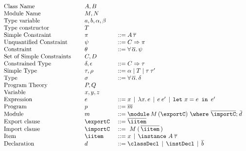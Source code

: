 \begin{figure} 

\[ \begin{array}[c]{llll}
\textrm{Class Name}         &\hspace{.1cm} & A,B            & \\
\textrm{Module Name}        &              & M,N            & \\
\textrm{Type variable}      &         & a,b,\alpha,\beta & \\
\textrm{Type constructor}   &         & T              & \\
\textrm{Simple Constraint}  &         & \pi            & ::= A\,\overline{\tau}\\
\textrm{Unquantified Constraint} &    & \psi           & ::= C\Rightarrow \pi\\
\textrm{Constraint}         &         & \theta         & ::= \forall\,\overline{\alpha}.\,\psi\\
\textrm{Set of Simple Constraints} &  & C,D            & \\
\textrm{Constrained Type}   &         & \delta,\epsilon & ::= C\Rightarrow \tau\\
\textrm{Simple Type}        &         & \tau, \rho     & ::= \alpha \mid T \mid \tau\:\tau' \\
\textrm{Type}               &         & \sigma         & ::= \forall\,\overline{\alpha}.\,\delta\\
\textrm{Program Theory}     &         & P,Q            &\\
\textrm{Variable}           &         & x, y, z        &\\
\textrm{Expression}         &         & e              & ::= x \,\mid\, \lambda x.\,e  \,\mid\, e\:e' \,\mid\, \mlet x = e\,\iin\,e'\\ 
\textrm{Program}            &         & p              & ::= \overline{m}\\
\textrm{Module}             &         & m              & ::= \module\, M\, (\exportC) \ \where\ \overline{\importC};\: \overline{\!d}\\
\textrm{Export clause}      &         & \exportC\      & ::= \overline{\iitem}\\
\textrm{Import clause}      &         & \importC\      & ::= \ M\: (\,\overline{\iitem}\,)\\
\textrm{Item}               &         & \iitem         & ::= x \,\mid\, \instance\ A\: \overline{\tau}\\ 
\textrm{Declaration}        &         & d              & ::= \classDecl \,\mid\, \instDecl \,\mid\, \overline{b}\\

\end{array}\]
\end{figure}
